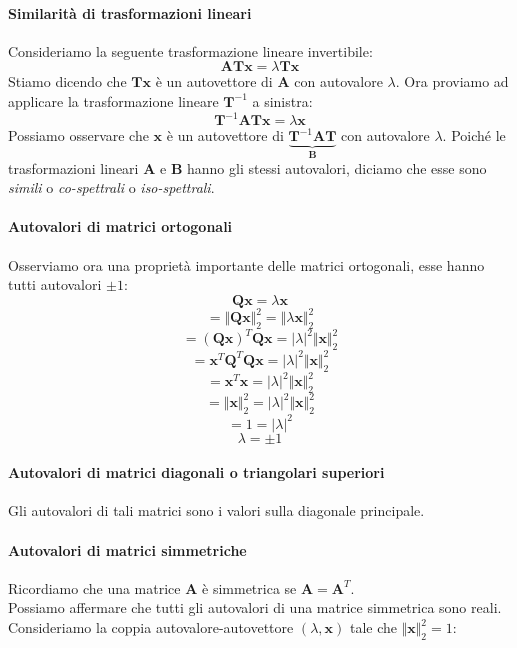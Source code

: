 \documentclass{article}
\begin{document}
        \paragraph{Similarità di trasformazioni lineari} Consideriamo la seguente trasformazione lineare invertibile:
        \[\mathbf{ATx} = \lambda\mathbf{Tx}\]
        Stiamo dicendo che $\mathbf{Tx}$ è un autovettore di $\mathbf{A}$ con autovalore $\lambda$. Ora proviamo 
        ad applicare la trasformazione lineare $\mathbf{T}^{-1}$ a sinistra:
        \[\mathbf{T}^{-1}\mathbf{ATx} = \lambda \mathbf{x}\]
        Possiamo osservare che $\mathbf{x}$ è un autovettore di $\underbrace{\mathbf{T}^{-1}\mathbf{AT}}_\mathbf{B}$ 
        con autovalore $\lambda$.
        Poiché le trasformazioni lineari $\mathbf{A}$ e $\mathbf{B}$ hanno gli stessi autovalori, 
        diciamo che esse sono \emph{simili} o \emph{co-spettrali} o \emph{iso-spettrali}.
        \paragraph{Autovalori di matrici ortogonali}
        Osserviamo ora una proprietà importante delle matrici ortogonali, esse hanno tutti autovalori $\pm1$:
        \[\mathbf{Qx} = \lambda \mathbf{x}\]
        \[= \Vert\mathbf{Qx}\Vert_2^2 = \Vert \lambda \mathbf{x} \Vert_2^2 \]
        \[ = (\mathbf{Qx})^T\mathbf{Qx} = |\lambda|^2\Vert \mathbf{x}\Vert_2^2\]
        \[ = \mathbf{x}^T\mathbf{Q}^T\mathbf{Qx} =|\lambda|^2\Vert \mathbf{x}\Vert_2^2 \]
        \[ = \mathbf{x}^T\mathbf{x} = |\lambda|^2\Vert\mathbf{x}\Vert_2^2\]
        \[ = \Vert\mathbf{x}\Vert_2^2 = |\lambda|^2\Vert\mathbf{x}\Vert_2^2\]
        \[ = 1 = |\lambda|^2\]
        \[ \lambda = \pm 1\]
        \paragraph{Autovalori di matrici diagonali o triangolari superiori}
        Gli autovalori di tali matrici sono i valori sulla diagonale principale.
        \paragraph{Autovalori di matrici simmetriche}
        Ricordiamo che una matrice $\mathbf{A}$ è simmetrica se $\mathbf{A} = \mathbf{A}^T$. \\
        Possiamo affermare che tutti gli autovalori di una matrice simmetrica sono reali. Consideriamo la coppia
        autovalore-autovettore $(\lambda, \mathbf{x})$ tale che $\Vert \mathbf{x} \Vert_2^2=1$:
\end{document}
